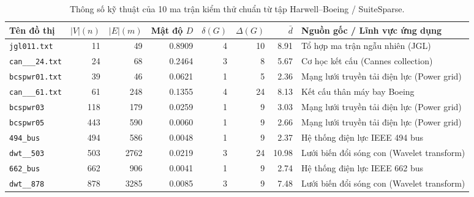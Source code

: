 \documentclass[a4paper,fleqn]{cas-sc}
\begin{document}
\begin{table}[pos=htbp]
\centering
\caption{Thông số kỹ thuật của 10 ma trận kiểm thử chuẩn từ tập Harwell--Boeing / SuiteSparse.}
\label{tab:harwell_boeing_specs}
\small
\begin{tabular*}{\textwidth}{@{\extracolsep{\fill}}lrrrrrrl@{}}
\toprule
Tên đồ thị & $|V| (n)$ & $|E| (m)$ & Mật độ $D$ & $\delta(G)$ & $\Delta(G)$ & $\bar{d}$ & Nguồn gốc / Lĩnh vực ứng dụng \\
\midrule
\texttt{jgl011.txt}     & 11  & 49   & 0.8909 & 4 & 10 & 8.91  & Tổ hợp ma trận ngẫu nhiên (JGL) \\
\texttt{can\_\_\_24.txt} & 24  & 68   & 0.2464 & 3 & 8  & 5.67  & Cơ học kết cấu (Cannes collection) \\
\texttt{bcspwr01.txt}   & 39  & 46   & 0.0621 & 1 & 5  & 2.36  & Mạng lưới truyền tải điện lực (Power grid) \\
\texttt{can\_\_\_61.txt} & 61  & 248  & 0.1355 & 4 & 24 & 8.13  & Kết cấu thân máy bay Boeing \\
\texttt{bcspwr03}       & 118 & 179  & 0.0259 & 1 & 9  & 3.03  & Mạng lưới truyền tải điện lực (Power grid) \\
\texttt{bcspwr05}       & 443 & 590  & 0.0060 & 1 & 9  & 2.66  & Mạng lưới truyền tải điện lực (Power grid) \\
\texttt{494\_bus}       & 494 & 586  & 0.0048 & 1 & 9  & 2.37  & Hệ thống điện lực IEEE 494 bus \\
\texttt{dwt\_\_503}     & 503 & 2762 & 0.0219 & 3 & 24 & 10.98 & Lưới biến đổi sóng con (Wavelet transform) \\
\texttt{662\_bus}       & 662 & 906  & 0.0041 & 1 & 9  & 2.74  & Hệ thống điện lực IEEE 662 bus \\
\texttt{dwt\_\_878}     & 878 & 3285 & 0.0085 & 3 & 9  & 7.48  & Lưới biến đổi sóng con (Wavelet transform) \\
\bottomrule
\end{tabular*}
\end{table}
\end{document}
